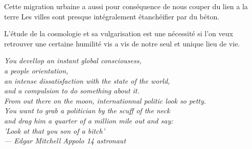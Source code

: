 Cette migration urbaine a aussi pour conséquence de nous couper du lien a la terre
Les villes sont presque intégralement étanchéifier par du béton.

L'étude de la cosmologie et sa vulgarisation est une nécessité si l'on veux retrouver une certaine humilité vis a vis de notre seul et unique lieu de vie.


\vspace{0.5cm}


\begin{flushright}{\slshape    
	You devellop an instant global consciousess, \\
	a people orientation,\\
	an intense dissatisfaction with the state of the world,\\
	and a compulsion to do something about it.\\
	From out there on the moon, internationnal politic look so petty. \\
	You want to grab a politician by the scuff of the neck\\
	and drag him a quarter of a million mile out and say: \\
	'Look at that you son of a bitch'\\ \medskip 
	--- Edgar Mitchell Appolo 14 astronaut }
\end{flushright}